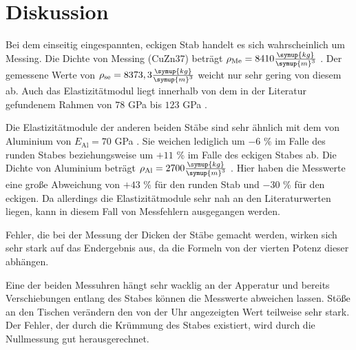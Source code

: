 \section{Diskussion}
\label{sec:Diskussion}

Bei dem einseitig eingespannten, eckigen Stab handelt es sich wahrscheinlich um Messing.
Die Dichte von Messing (CuZn37) beträgt $\rho_\text{Me} = 8410 \frac{\symup{kg}}{\symup{m}^3}$ \cite{messing}. 
Der gemessene Werte von $\rho_\text{se} = 8373,3 \frac{\symup{kg}}{\symup{m}^3}$ weicht nur sehr gering von diesem ab.
Auch das Elastizitätmodul liegt innerhalb von dem in der Literatur gefundenem Rahmen von $78$ GPa bis $123$ GPa \cite{messing}.

Die Elastizitätmodule der anderen beiden Stäbe sind sehr ähnlich mit dem von Aluminium von $E_\text{Al} = 70$ GPa \cite{ela}.
Sie weichen lediglich um $-6$ \% im Falle des runden Stabes beziehungsweise um $+11$ \% im Falle des eckigen Stabes ab.
Die Dichte von Aluminium beträgt $\rho_\text{Al} = 2700 \frac{\symup{kg}}{\symup{m}^3}$ \cite{alu}.
Hier haben die Messwerte eine große Abweichung von $+43$ \% für den runden Stab und $-30$ \% für den eckigen. Da allerdings die Elastizitätmodule sehr nah an den Literaturwerten liegen, kann in diesem Fall von Messfehlern ausgegangen werden.

Fehler, die bei der Messung der Dicken der Stäbe gemacht werden, wirken sich sehr stark auf das Endergebnis aus, da die Formeln von der vierten Potenz dieser abhängen.

Eine der beiden Messuhren hängt sehr wacklig an der Apperatur und bereits Verschiebungen entlang des Stabes können die Messwerte abweichen lassen.
Stöße an den Tischen verändern den von der Uhr angezeigten Wert teilweise sehr stark.
Der Fehler, der durch die Krümmung des Stabes existiert, wird durch die Nullmessung gut herausgerechnet.


